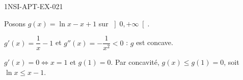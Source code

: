 \begin{corrige}{1NSI-APT-EX-021}

Posons $g(x) = \ln x - x + 1$ sur $\left]0, +\infty\right[$.


$g'(x) = \dfrac{1}{x} - 1$ et $g''(x) = -\dfrac{1}{x^2} < 0$ : $g$ est concave.

$g'(x) = 0 \iff x = 1$ et $g(1) = 0$. Par concavité, $g(x) \leq g(1) = 0$, soit $\ln x \leq x - 1$.

\end{corrige}
